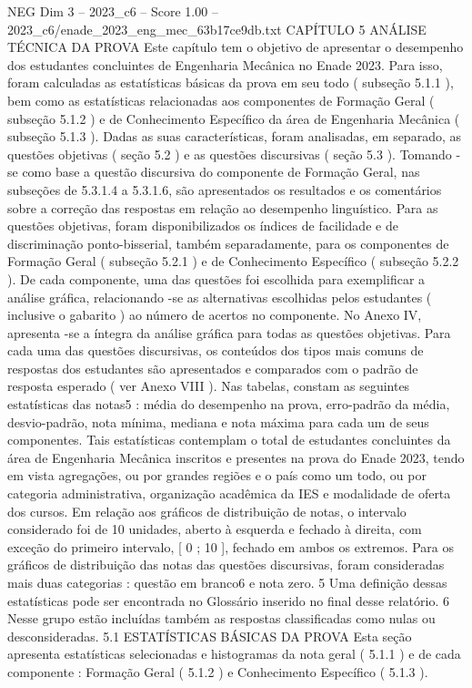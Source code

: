 \begin{textsample}{NEG Dim 3 – 2023\_c6 – Score 1.00 – 2023\_c6/enade\_2023\_eng\_mec\_63b17ce9db.txt}  \label{ex:f3_neg_184}
CAPÍTULO 5 ANÁLISE TÉCNICA DA PROVA Este capítulo tem o objetivo de apresentar o desempenho dos estudantes concluintes de Engenharia Mecânica no Enade 2023.
Para isso, foram calculadas as estatísticas básicas da prova em seu todo ( subseção 5.1.1 ), bem como as estatísticas relacionadas aos componentes de Formação Geral ( subseção 5.1.2 ) e de Conhecimento Específico da área de Engenharia Mecânica ( subseção 5.1.3 ).
Dadas as suas características, foram analisadas, em separado, as questões objetivas ( seção 5.2 ) e as questões discursivas ( seção 5.3 ).
Tomando -se como base a questão discursiva do componente de Formação Geral, nas subseções de 5.3.1.4 a 5.3.1.6, são apresentados os resultados e os comentários sobre a correção das respostas em relação ao desempenho linguístico.
Para as questões objetivas, foram disponibilizados os índices de facilidade e de discriminação ponto-bisserial, também separadamente, para os componentes de Formação Geral ( subseção 5.2.1 ) e de Conhecimento Específico ( subseção 5.2.2 ).
De cada componente, uma das questões foi escolhida para exemplificar a análise gráfica, relacionando -se as alternativas escolhidas pelos estudantes ( inclusive o gabarito ) ao número de acertos no componente.
No Anexo IV, apresenta -se a íntegra da análise gráfica para todas as questões objetivas.
Para cada uma das questões discursivas, os conteúdos dos tipos mais comuns de respostas dos estudantes são apresentados e comparados com o padrão de resposta esperado ( ver Anexo VIII ).
Nas tabelas, constam as seguintes estatísticas das notas5 : média do desempenho na prova, erro-padrão da média, desvio-padrão, nota mínima, mediana e nota máxima para cada um de seus componentes.
Tais estatísticas contemplam o total de estudantes concluintes da área de Engenharia Mecânica inscritos e presentes na prova do Enade 2023, tendo em vista agregações, ou por grandes regiões e o país como um todo, ou por categoria administrativa, organização acadêmica da IES e modalidade de oferta dos cursos.
Em relação aos gráficos de distribuição de notas, o intervalo considerado foi de 10 unidades, aberto à esquerda e fechado à direita, com exceção do primeiro intervalo, [ 0 ; 10 ], fechado em ambos os extremos.
Para os gráficos de distribuição das notas das questões discursivas, foram consideradas mais duas categorias : questão em branco6 e nota zero. 5 Uma definição dessas estatísticas pode ser encontrada no Glossário inserido no final desse relatório. 6 Nesse grupo estão incluídas também as respostas classificadas como nulas ou desconsideradas. 5.1 ESTATÍSTICAS BÁSICAS DA PROVA Esta seção apresenta estatísticas selecionadas e histogramas da nota geral ( 5.1.1 ) e de cada componente : Formação Geral ( 5.1.2 ) e Conhecimento Específico ( 5.1.3 ).

\end{textsample}
